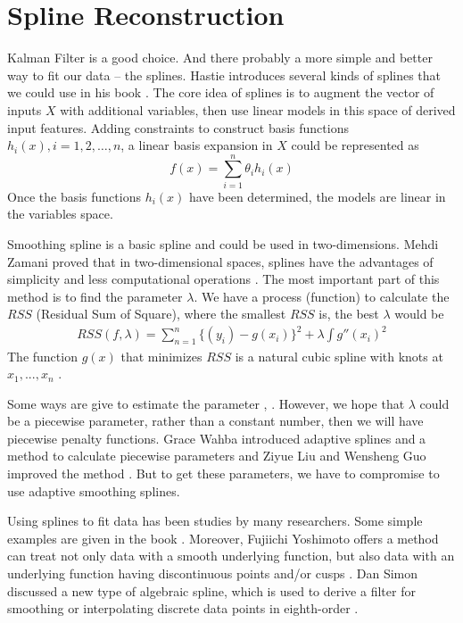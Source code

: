 \section{Spline Reconstruction}



Kalman Filter is a good choice. And there probably a more simple and better way to fit our data -- the splines. Hastie introduces several kinds of splines that we could use in his book \cite{ESLII}. The core idea of splines is to augment the vector of inputs $X$ with additional variables, then use linear models in this space of derived input features. Adding constraints to construct basis functions $h_i(x), i = 1, 2,\ldots, n$, a linear basis expansion in $X$ could be represented as
\[ f(x)=\sum_{i=1}^n \theta_i h_i(x) \]
Once the basis functions $h_i(x)$ have been determined, the models are linear in the variables space. 

Smoothing spline is a basic spline and could be used in two-dimensions. Mehdi Zamani proved that in two-dimensional spaces, splines have the advantages of simplicity and less computational operations \cite{smoothsplinein2D}. The most important part of this method is to find the parameter $\lambda$. We have a process (function)  to calculate the $RSS$ (Residual Sum of Square), where the smallest $RSS$ is, the best $\lambda$ would be
\begin{align*}
RSS(f,\lambda)=\sum_{n=1}^{n}\{(y_i)-g(x_i)\}^2+\lambda\int g''(x_i)^2
\end{align*}
The function $g(x)$ that minimizes $RSS$ is a natural cubic spline with knots at $x_1,...,x_n$ \cite{ESLII}. 

Some ways are give to estimate the parameter \cite{smoothingparameter}, \cite{kim2004smoothing}. However, we hope that $\lambda$ could be a piecewise parameter, rather than a constant number, then we will have piecewise penalty functions. Grace Wahba introduced adaptive splines and a method to calculate piecewise parameters \cite{donoho1995wavelet} and Ziyue Liu and Wensheng Guo improved the method \cite{liu2010data}. But to get these parameters, we have to compromise to use adaptive smoothing splines. 

Using splines to fit data has been studies by many researchers. Some simple examples are given in the book \cite{ESLII}. Moreover, Fujiichi Yoshimoto offers a method can treat not only data with a smooth underlying function, but also data with an underlying function having discontinuous points and/or cusps \cite{yoshimoto2003}. Dan Simon discussed a new type of algebraic spline, which is used to derive a filter for smoothing or interpolating discrete data points in eighth-order \cite{simon2004data}.

